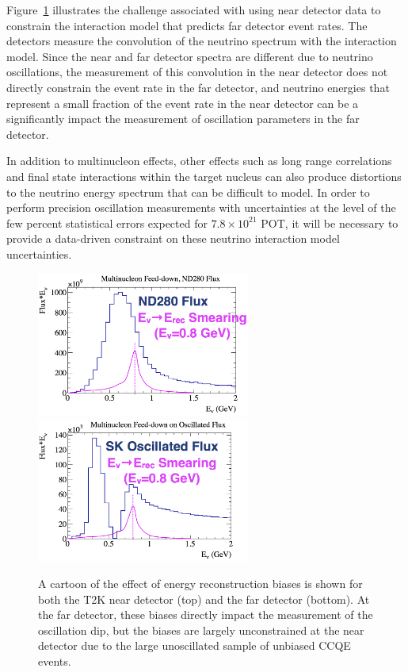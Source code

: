 Figure~\ref{fig:badnd} illustrates the challenge associated with using near detector data to constrain the interaction model that predicts far detector event rates. The detectors measure the convolution of the neutrino spectrum with the interaction model.  Since the near and far detector spectra are different due to neutrino oscillations, the measurement of this convolution in the near detector does not directly constrain the event rate in the far detector, and neutrino energies that represent a small fraction of the event rate in the near detector can be a significantly impact the measurement of oscillation parameters in the far detector.

In addition to multinucleon effects, other effects such as long range correlations and final state interactions within the target nucleus can also produce distortions to the neutrino energy spectrum that can be difficult to model. In order to perform precision oscillation measurements with uncertainties at the level of the few percent statistical errors expected for $7.8\times10^{21}$ POT, it will be necessary to provide a data-driven constraint on these neutrino interaction model uncertainties.

\begin{figure}[htpb]
     \begin{center}
       \includegraphics[width=7cm]{figures/MartiniFeedDownND280_2.png}
       \includegraphics[width=7cm]{figures/MartiniFeedDownSK_2.png}
       \caption{A cartoon of the effect of energy reconstruction biases is shown for both the T2K near detector (top) and the far detector (bottom). At the far detector, these biases directly impact the measurement of the oscillation dip, but the biases are largely unconstrained at the near detector due to the large unoscillated sample of unbiased CCQE events.}
       \label{fig:badnd}
     \end{center}
\end{figure}

